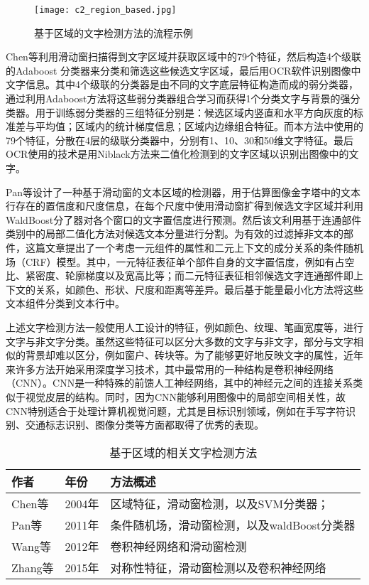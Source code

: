    \begin{figure}[!h]
    \centering
    \texttt{[image: c2\_region\_based.jpg]}
    \caption{基于区域的文字检测方法的流程示例}
    \label{fig.c2_region_based}
    \end{figure}

    Chen等\cite{Chen2004Detecting}利用滑动窗扫描得到文字区域并获取区域中的79个特征，然后构造4个级联的Adaboost 分类器来分类和筛选这些候选文字区域，最后用OCR软件识别图像中文字信息。其中4个级联的分类器是由不同的文字底层特征构造而成的弱分类器，通过利用Adaboost方法将这些弱分类器组合学习而获得1个分类文字与背景的强分类器。用于训练弱分类器的三组特征分别是：候选区域内竖直和水平方向灰度的标准差与平均值；区域内的统计梯度信息；区域内边缘组合特征。而本方法中使用的79个特征，分散在4层的级联分类器中，分别有1、10、30和50维文字特征。最后OCR使用的技术是用Niblack方法来二值化检测到的文字区域以识别出图像中的文字。

    Pan等\cite{Pan2011A}设计了一种基于滑动窗的文本区域的检测器，用于估算图像金字塔中的文本行存在的置信度和尺度信息，在每个尺度中使用滑动窗扩得到候选文字区域并利用WaldBoost分了器对各个窗口的文字置信度进行预测。然后该文利用基于连通部件类别中的局部二值化方法对候选文本分量进行分割。为有效的过滤掉非文本的部件，这篇文章提出了一个考虑一元组件的属性和二元上下文的成分关系的条件随机场（CRF）模型。其中，一元特征表征单个部件自身的文字置信度，例如有占空比、紧密度、轮廓梯度以及宽高比等；而二元特征表征相邻候选文字连通部件即上下文的关系，如颜色、形状、尺度和距离等差异。最后基于能量最小化方法将这些文本组件分类到文本行中。
    
    上述文字检测方法一般使用人工设计的特征，例如颜色、纹理、笔画宽度等，进行文字与非文字分类。虽然这些特征可以区分大多数的文字与非文字，部分与文字相似的背景却难以区分，例如窗户、砖块等。为了能够更好地反映文字的属性，近年来许多方法开始采用深度学习技术，其中最常用的一种结构是卷积神经网络（CNN）。CNN是一种特殊的前馈人工神经网络，其中的神经元之间的连接关系类似于视觉皮层的结构。同时，因为CNN能够利用图像中的局部空间相关性，故CNN特别适合于处理计算机视觉问题，尤其是目标识别领域，例如在手写字符识别、交通标志识别、图像分类等方面都取得了优秀的表现。
    
    

    \begin{table*}[!h]
    \centering
    \caption{基于区域的相关文字检测方法}
    \begin{tabular}{p{}|p{}| p{}}
    \hline
    作者 & 年份 & 方法概述 \\
    \hline
    Chen等\cite{Chen2004Detecting} & 2004年 & 区域特征，滑动窗检测，以及SVM分类器；\\
    Pan等\cite{Pan2011A} & 2011年 &   条件随机场，滑动窗检测，以及waldBoost分类器\\
    Wang等\cite{Wang2012End} & 2012年 & 卷积神经网络和滑动窗检测 \\
    Zhang等\cite{Zhang2015Symmetry} & 2015年 & 对称性特征，滑动窗检测以及卷积神经网络 \\
    \hline
    \end{tabular}
    \label{tab.c2_region_based}
    \end{table*}

